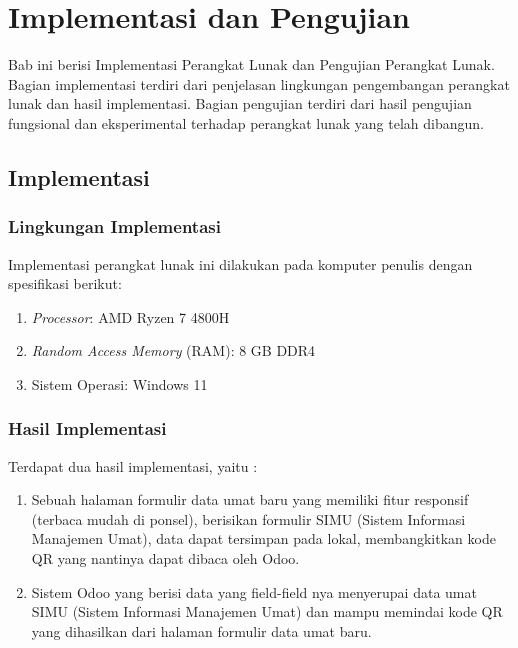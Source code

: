 \chapter{Implementasi dan Pengujian}
\label{chap:implementasiPengujian}

Bab ini berisi Implementasi Perangkat Lunak dan Pengujian Perangkat Lunak. Bagian implementasi terdiri dari penjelasan lingkungan pengembangan perangkat lunak dan hasil implementasi. Bagian pengujian terdiri dari hasil pengujian fungsional dan eksperimental terhadap perangkat lunak yang
telah dibangun.

\section{Implementasi}
\label{sec:implementasi} 

\subsection{Lingkungan Implementasi}
\label{sec:lingkunganImplementasi}

Implementasi perangkat lunak ini dilakukan pada komputer penulis dengan spesifikasi berikut:

\begin{enumerate}
	\item \textit{Processor}: AMD Ryzen 7 4800H
	\item \textit{Random Access Memory} (RAM): 8 GB DDR4
	\item Sistem Operasi: Windows 11
\end{enumerate}

\subsection{Hasil Implementasi}
\label{sec:hasilImplementasi}

Terdapat dua hasil implementasi, yaitu :

\begin{enumerate}
	\item Sebuah halaman formulir data umat baru yang memiliki fitur responsif (terbaca mudah di ponsel), berisikan formulir SIMU (Sistem Informasi Manajemen Umat), data dapat tersimpan pada lokal, membangkitkan kode QR  yang nantinya dapat dibaca oleh Odoo.
	\item Sistem Odoo yang berisi data yang field-field nya menyerupai data umat SIMU (Sistem Informasi Manajemen Umat) dan mampu memindai kode QR yang dihasilkan dari halaman formulir data umat baru. 
\end{enumerate}


